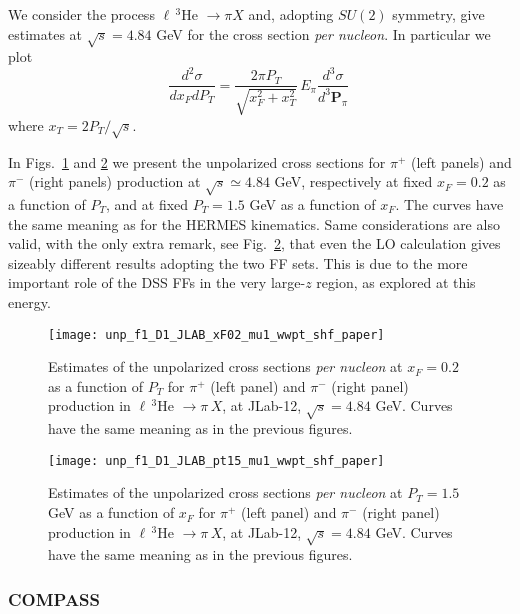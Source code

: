 \documentclass[nofootinbib,superscriptaddress,aps]{revtex4}
\newcommand{\be}{\begin{equation}}
\newcommand{\ee}{\end{equation}}
\begin{document}
We consider the process $\ell\,^3$He $\to \pi X$ and, adopting $SU(2)$ symmetry, give estimates at $\sqrt s= 4.84$ GeV for the cross section \emph{per nucleon}. In particular we plot
\be
\frac{d^2\sigma}{dx_FdP_T} = \frac{2\pi P_T}{\sqrt{x_F^2+ x_T^2}} \, E_\pi \frac{d^3\sigma}{d^3\bm{P}_\pi}\,
\ee
where $x_T= 2 P_T/\sqrt s$.

In Figs.~\ref{fig:unp-jlab-xf02} and \ref{fig:unp-jlab-pt15} we present the unpolarized cross sections for $\pi^+$ (left panels) and $\pi^-$ (right panels) production at $\sqrt s\simeq 4.84$ GeV, respectively at fixed $x_F=0.2$ as a function of $P_T$, and at fixed $P_T=1.5$ GeV as a function of $x_F$. The curves have the same meaning as for the HERMES kinematics. Same considerations are also valid, with the only extra remark, see Fig.~\ref{fig:unp-jlab-pt15}, that even the LO calculation gives sizeably different results adopting the two FF sets. This is due to the more important role of the DSS FFs in the very large-$z$ region, as explored at this energy.

\begin{figure}[ht!]
 \centering
 \texttt{[image: unp\_f1\_D1\_JLAB\_xF02\_mu1\_wwpt\_shf\_paper]}
 \caption{Estimates of the unpolarized cross sections \emph{per nucleon} at $x_F=0.2$ as a function of $P_T$ for $\pi^+$ (left panel) and $\pi^-$ (right panel) production in $\ell\,^3$He $\to \pi\,X$, at JLab-12, $\sqrt{s} = 4.84$ GeV. Curves have the same meaning as in the previous figures.
}
  \label{fig:unp-jlab-xf02}
\end{figure}

\begin{figure}[ht!]
 \centering
 \texttt{[image: unp\_f1\_D1\_JLAB\_pt15\_mu1\_wwpt\_shf\_paper]}
 \caption{Estimates of the unpolarized cross sections \emph{per nucleon} at $P_T=1.5$ GeV as a function of $x_F$ for $\pi^+$ (left panel) and $\pi^-$ (right panel) production in $\ell \,^3$He $\to \pi\,X$, at JLab-12, $\sqrt{s} = 4.84$ GeV. Curves have the same meaning as in the previous figures.}
  \label{fig:unp-jlab-pt15}
\end{figure}




\subsubsection {COMPASS}
\end{document}
